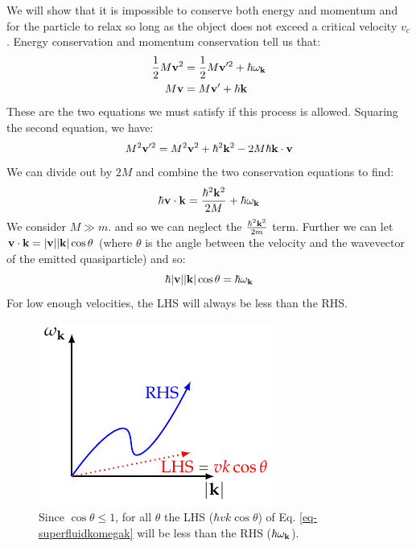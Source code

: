 We will show that it is impossible to conserve both energy and momentum and for the particle to relax so long as the object does not exceed a critical velocity $v_c$. Energy conservation and momentum conservation tell us that:
\begin{equation}
    \begin{split}
        \frac{1}{2}M\mathbf{v}^2 &= \frac{1}{2}M\mathbf{v}'^2 + \hbar \omega_{\mathbf{k}}
        \\ M\mathbf{v} &= M\mathbf{v}' + \hbar\mathbf{k}
    \end{split}
\end{equation}
These are the two equations we must satisfy if this process is allowed.
Squaring the second equation, we have:
\begin{align*}
    M^2\mathbf{v}'^2 = M^2\mathbf{v}^2 + \hbar^2\mathbf{k}^2 - 2M\hbar \mathbf{k} \cdot \mathbf{v}
\end{align*}
We can divide out by $2M$ and combine the two conservation equations to find:
\begin{equation}
    \hbar \mathbf{v} \cdot \mathbf{k} = \frac{\hbar^2\mathbf{k}^2}{2M} + \hbar \omega_{\mathbf{k}}
\end{equation}
We consider $M \gg m$. and so we can neglect the $ \frac{\hbar^2\mathbf{k}^2}{2m}$ term. Further we can let $\mathbf{v} \cdot \mathbf{k} = \lvert \mathbf{v} \rvert\lvert \mathbf{k} \rvert\cos\theta$ (where $\theta$ is the angle between the velocity and the wavevector of the emitted quasiparticle) and so:
\begin{equation}\label{eq-superfluidkomegak}
    \hbar \lvert \mathbf{v} \rvert\lvert \mathbf{k} \rvert\cos\theta = \hbar \omega_{\mathbf{k}}
\end{equation}
For low enough velocities, the LHS will always be less than the RHS.

\begin{figure}[htbp]
    \centering
    \includegraphics[]{Images/fig-fig-graphicalsuperfluidsoln.pdf}

    \caption{Since $\cos\theta \leq 1$, for all $\theta$ the LHS ($\hbar vk\cos\theta$) of Eq. \eqref{eq-superfluidkomegak} will be less than the RHS ($\hbar \omega_{\mathbf{k}}$).}
    \label{fig-graphicalsuperfluidsoln}
\end{figure}

